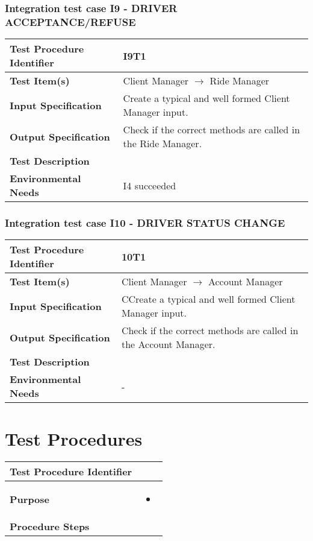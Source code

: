 \subsubsection{Integration test case I9 - DRIVER ACCEPTANCE/REFUSE }
 \begin{tabular}{l p{}}
    \hline
    \textbf{Test Procedure Identifier} & I9T1  \\
    \hline
    \textbf{Test Item(s)} & Client Manager  $\rightarrow$ Ride Manager \\
    \hline
    \textbf{Input Specification} &  Create a typical and well formed Client Manager input.   \\
    \hline
    \textbf{Output Specification} & Check if the correct methods are called in the Ride Manager. \\
    \hline
    \textbf{Test Description} & \\
    \hline
    \textbf{Environmental Needs} & I4 succeeded \\
    \hline
\end{tabular}

\hfill \newline \newline  
\subsubsection{Integration test case I10 - DRIVER STATUS CHANGE } 
\begin{tabular}{l p{}}
    \hline
    \textbf{Test Procedure Identifier} & 10T1 \\
    \hline
    \textbf{Test Item(s)} & Client Manager  $\rightarrow$ Account Manager \\
    \hline
    \textbf{Input Specification} &  CCreate a typical and well formed Client Manager input. \\
    \hline
    \textbf{Output Specification} &  Check if the correct methods are called in the Account Manager.\\
    \hline
    \textbf{Test Description} & \\
    \hline
    \textbf{Environmental Needs} & - \\
    \hline
\end{tabular}

\newpage
\section{Test Procedures}
\hfill \newline 
\begin{tabular}{l p{}}
    \hline
    \textbf{Test Procedure Identifier} &  \\
    \hline
    \textbf{Purpose} & \begin{itemize}
    	\item 
    \end{itemize} \\
    \hline
    \textbf{Procedure Steps} & \\
    \hline
    \end{tabular}



